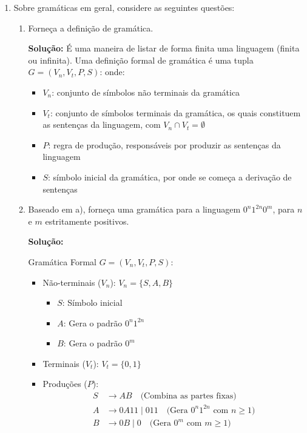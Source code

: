 \documentclass[12pt]{article}
\begin{document}
\begin{enumerate}
	\item Sobre gramáticas em geral, considere as seguintes questões:
	      \begin{enumerate}[label=\alph*)]
		      \item Forneça a definição de gramática.
		            
		            \textbf{Solução:} É uma maneira de listar de forma finita uma linguagem (finita ou infinita). Uma definição formal de gramática é uma tupla $G=(V_n,V_t,P,S)$: onde:
		            \begin{itemize}
			            \item $V_n$: conjunto de símbolos não terminais da gramática
			            \item $V_t$: conjunto de símbolos terminais da gramática, os quais constituem as sentenças da linguagem, com $V_n \cap V_t = \emptyset$
			            \item $P$: regra de produção, responsáveis por produzir as sentenças da linguagem
			            \item $S$: símbolo inicial da gramática, por onde se começa a derivação de sentenças
		            \end{itemize}
		            
		      \item Baseado em a), forneça uma gramática para a linguagem $0^n1^{2n}0^m$, para $n$ e $m$ estritamente positivos.
		            
		            \textbf{Solução:}
		            
		            Gramática Formal $G=(V_n,V_t,P,S)$:
		            
		            \begin{itemize}
			            \item Não-terminais ($V_n$): $V_n = \{S, A, B\}$
			                  \begin{itemize}
				                  \item $S$: Símbolo inicial
				                  \item $A$: Gera o padrão $0^n1^{2n}$
				                  \item $B$: Gera o padrão $0^m$
			                  \end{itemize}
			                  
			            \item Terminais ($V_t$): $V_t = \{0, 1\}$
			                  
			            \item Produções ($P$):
			                  \begin{align*}
				                  S & \rightarrow AB \quad \text{(Combina as partes fixas)}                    \\
				                  A & \rightarrow 0A11 \mid 011 \quad \text{(Gera $0^n1^{2n}$ com $n \geq 1$)} \\
				                  B & \rightarrow 0B \mid 0 \quad \text{(Gera $0^m$ com $m \geq 1$)}
			                  \end{align*}
			                  

\end{itemize}
\end{enumerate}
\end{enumerate}
\end{document}
